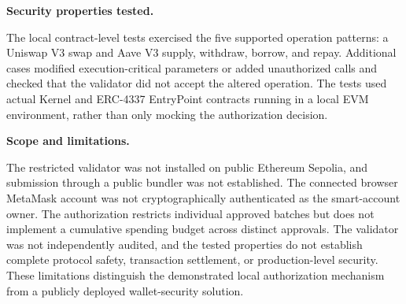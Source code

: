 \medskip
\noindent\textbf{Security properties tested.}

The local contract-level tests exercised the five supported
operation patterns: a Uniswap V3 swap and Aave V3 supply,
withdraw, borrow, and repay. Additional cases modified
execution-critical parameters or added unauthorized calls
and checked that the validator did not accept the altered
operation. The tests used actual Kernel and ERC-4337 EntryPoint
contracts running in a local EVM environment, rather than
only mocking the authorization decision.

\medskip
\noindent\textbf{Scope and limitations.}

The restricted validator was not installed on public Ethereum
Sepolia, and submission through a public bundler was not
established. The connected browser MetaMask account was not
cryptographically authenticated as the smart-account owner.
The authorization restricts individual approved batches but
does not implement a cumulative spending budget across distinct
approvals. The validator was not independently audited, and
the tested properties do not establish complete protocol safety,
transaction settlement, or production-level security. These
limitations distinguish the demonstrated local authorization
mechanism from a publicly deployed wallet-security solution.